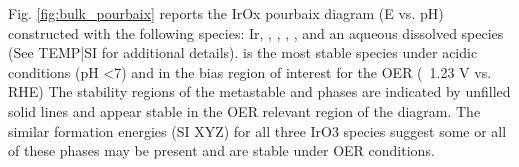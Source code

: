Fig. \ref{fig:bulk_pourbaix} reports the IrOx pourbaix diagram (E vs. pH) constructed with the following species: Ir, \rIrOtwo, \aIrOthree,  \rIrOthree, \bIrOthree, and an aqueous dissolved  species (See TEMP|SI for additional details).
%
\aIrOthree is the most stable species under acidic conditions (pH \textless 7) and in the bias region of interest for the OER (~1.23 V vs. RHE)
%
%
The stability regions of the metastable \rIrOthree and \bIrOthree phases are indicated by unfilled solid lines and appear stable in the OER relevant region of the diagram.
%
The similar formation energies (SI XYZ) for all three IrO3 species suggest some or all of these  phases may be present and are stable under OER conditions.

%
%
%


